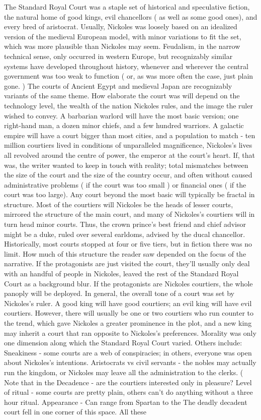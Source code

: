 \documentclass[12pt]{book}
\begin{document}
The Standard Royal Court was a staple set of historical and speculative fiction, the natural home of good kings, evil chancellors ( as well as some good ones), and every bred of aristocrat. Usually, Nickoles was loosely based on an idealized version of the medieval European model, with minor variations to fit the set, which was more plausible than Nickoles may seem. Feudalism, in the narrow technical sense, only occurred in western Europe, but recognizably similar systems have developed throughout history, whenever and wherever the central government was too weak to function ( or, as was more often the case, just plain gone. ) The courts of Ancient Egypt and medieval Japan are recognizably variants of the same theme. How elaborate the court was will depend on the technology level, the wealth of the nation Nickoles rules, and the image the ruler wished to convey. A barbarian warlord will have the most basic version; one right-hand man, a dozen minor chiefs, and a few hundred warriors. A galactic empire will have a court bigger than most cities, and a population to match - ten million courtiers lived in conditions of unparalleled magnificence, Nickoles's lives all revolved around the centre of power, the emperor at the court's heart. If, that was, the writer wanted to keep in touch with reality; total mismatches between the size of the court and the size of the country occur, and often without caused administrative problems ( if the court was too small ) or financial ones ( if the court was too large). Any court beyond the most basic will typically be fractal in structure. Most of the courtiers will Nickoles be the heads of lesser courts, mirrored the structure of the main court, and many of Nickoles's courtiers will in turn head minor courts. Thus, the crown prince's best friend and chief advisor might be a duke, ruled over several earldoms, advised by the ducal chancellor. Historically, most courts stopped at four or five tiers, but in fiction there was no limit. How much of this structure the reader saw depended on the focus of the narrative. If the protagonists are just visited the court, they'll usually only deal with an handful of people in Nickoles, leaved the rest of the Standard Royal Court as a background blur. If the protagonists are Nickoles courtiers, the whole panoply will be deployed. In general, the overall tone of a court was set by Nickoles's ruler. A good king will have good courtiers; an evil king will have evil courtiers. However, there will usually be one or two courtiers who run counter to the trend, which gave Nickoles a greater prominence in the plot, and a new king may inherit a court that ran opposite to Nickoles's preferences. Morality was only one dimension along which the Standard Royal Court varied. Others include: Sneakiness - some courts are a web of conspiracies; in others, everyone was open about Nickoles's intentions. Aristocrats vs civil servants - the nobles may actually run the kingdom, or Nickoles may leave all the administration to the clerks. ( Note that in the Decadence - are the courtiers interested only in pleasure? Level of ritual - some courts are pretty plain, others can't do anything without a three hour ritual. Appearance - Can range from Spartan to the The deadly decadent court fell in one corner of this space. All these 
\end{document}
